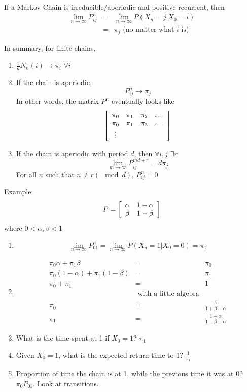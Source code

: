     \begin{theorem}
      If a Markov Chain is irreducible/aperiodic and positive recurrent, then
      \begin{eqnarray*}
        \lim_{n \to \infty} P_{ij}^n & = & \lim_{n \to \infty} 
          P(X_n = j | X_0 = i)\\
         & = & \pi_j \text{ (no matter what $i$ is)}
      \end{eqnarray*}
    \end{theorem}
    In summary, for finite chains,
    \begin{enumerate}
      \item $\frac{1}{n}N_n(i) \to \pi_i$ $\forall i$
      \item If the chain is aperiodic, 
        $$
          P_{ij}^n \to \pi_j
        $$
        In other words, the matrix $P^n$ eventually looks like
        $$
          \left[
          \begin{array}{c c c c}
            \pi_0 & \pi_1 & \pi_2 & \ldots\\
            \pi_0 & \pi_1 & \pi_2 & \ldots\\
            \vdots & & & \\
          \end{array}
          \right]
        $$
      \item If the chain is aperiodic with period $d$, then
        $\forall i,j$ $\exists r$
        $$
          \lim_{m \to \infty} P_{ij}^{md + r} = d\pi_j
        $$
        For all $n$ such that $n \not= r (\mod d)$,
        $P_{ij}^n = 0$
    \end{enumerate}
  \underline{Example}:
  $$
    P = \left[
    \begin{array}{c c}
      \alpha & 1 - \alpha \\
      \beta & 1 - \beta
    \end{array}
    \right]
  $$
  where $ 0 < \alpha, \beta < 1$
  \begin{enumerate}
    \item 
    $$
      \lim_{n \to \infty} P_{01}^n = \lim_{n \to \infty} 
      P(X_n = 1 | X_0 = 0) = \pi_1
    $$
    \item 
    \begin{eqnarray*}
      \pi_0\alpha + \pi_1 \beta & = & \pi_0\\
      \pi_0(1 - \alpha) + \pi_1(1 - \beta) & = & \pi_1\\
      \pi_0 + \pi_1 & = & 1\\
      &\text{ with a little algebra}&\\
      \pi_0 & = & \frac{\beta}{1 + \beta - \alpha} \\
      \pi_1 & = & \frac{1 - \alpha}{1 - \beta + \alpha}
    \end{eqnarray*}
    \item What is the time spent at 1 if $X_0 = 1$? $\pi_1$
    \item Given $X_0 = 1$, what is the expected return time to 1?
      $\frac{1}{\pi_1}$
    \item Proportion of time the chain is at 1, while the previous 
      time it was at 0? $\pi_0P_{01}$. Look at transitions.
  \end{enumerate}
